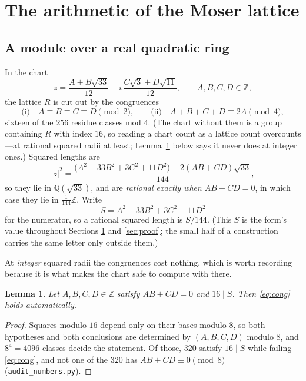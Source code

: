 \documentclass[11pt,reqno]{amsart}
\theoremstyle{plain}
\newtheorem{lemma}[theorem]{Lemma}
\theoremstyle{definition}
\newcommand{\Z}{\mathbb{Z}}
\newcommand{\Q}{\mathbb{Q}}
\newcommand{\Lat}{R}
\begin{document}
\section{The arithmetic of the Moser lattice}\label{sec:arith}

\subsection{A module over a real quadratic ring}
In the chart
\begin{equation}\label{eq:chart}
  z = \frac{A + B\sqrt{33}}{12} + i\,\frac{C\sqrt3 + D\sqrt{11}}{12},
  \qquad A,B,C,D \in \Z,
\end{equation}
the lattice $\Lat$ is cut out by the congruences
\begin{equation}\label{eq:cong}
  \text{(i)}\quad A \equiv B \equiv C \equiv D \pmod 2,
  \qquad
  \text{(ii)}\quad A + B + C + D \equiv 2A \pmod 4,
\end{equation}
sixteen of the $256$ residue classes mod $4$. (The chart without them is a group
containing $\Lat$ with index $16$, so reading a chart count as a lattice count
overcounts---at rational squared radii at least; Lemma~\ref{lem:auto} below says
it never does at integer ones.) Squared lengths are
\begin{equation}\label{eq:norm}
  \lvert z \rvert^2
  = \frac{\big(A^2 + 33B^2 + 3C^2 + 11D^2\big) + 2(AB + CD)\sqrt{33}}{144},
\end{equation}
so they lie in $\Q(\sqrt{33})$, and are \emph{rational exactly when
$AB + CD = 0$}, in which case they lie in $\tfrac1{144}\Z$. Write
\[
  S = A^2 + 33B^2 + 3C^2 + 11D^2
\]
for the numerator, so a rational squared length is $S/144$. (This $S$ is the
form's value throughout Sections \ref{sec:arith} and \ref{sec:proof}; the small
half of a construction carries the same letter only outside them.)

At \emph{integer} squared radii the congruences cost nothing, which is worth
recording because it is what makes the chart safe to compute with there.

\begin{lemma}\label{lem:auto}
Let $A,B,C,D \in \Z$ satisfy $AB + CD = 0$ and $16 \mid S$. Then \eqref{eq:cong}
holds automatically.
\end{lemma}

\begin{proof}
Squares modulo $16$ depend only on their bases modulo $8$, so both hypotheses and
both conclusions are determined by $(A,B,C,D)$ modulo $8$, and $8^4 = 4096$
classes decide the statement. Of those, $320$ satisfy $16 \mid S$ while failing
\eqref{eq:cong}, and not one of the $320$ has $AB+CD \equiv 0 \pmod 8$
(\texttt{audit\_numbers.py}).
\end{proof}
\end{document}
